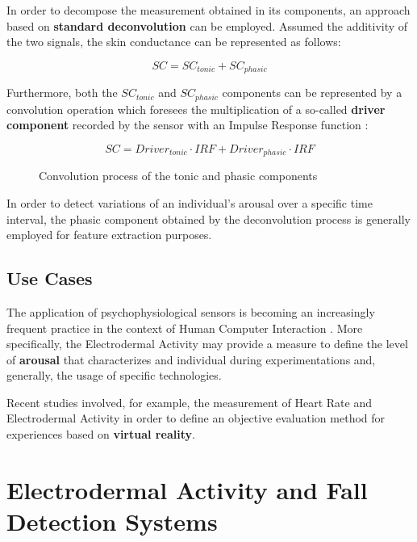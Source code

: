 In order to decompose the measurement obtained in its components, an approach based on \textbf{standard deconvolution} can be employed. Assumed the additivity of the two signals, the skin conductance can be represented as follows:

\begin{equation}
    SC = SC_{tonic} + SC_{phasic}
\end{equation}

Furthermore, both the $SC_{tonic}$ and $SC_{phasic}$ components can be represented by a convolution operation which foresees the multiplication of a so-called \textbf{driver component} recorded by the sensor with an Impulse Response function \cite{edasvm}:

\begin{figure}[h]
\begin{equation}
SC = Driver_{tonic} \cdot IRF + Driver_{phasic} \cdot IRF
\end{equation}
\caption{Convolution process of the tonic and phasic components}
\label{fig:eda-convolution}
\end{figure}

In order to detect variations of an individual's arousal over a specific time interval, the phasic component obtained by the deconvolution process is generally employed for feature extraction purposes.

\subsection{Use Cases}\label{subsec:eda-usecases}

The application of psychophysiological sensors is becoming an increasingly frequent practice in the context of Human Computer Interaction \cite{eda-hci}. More specifically, the Electrodermal Activity may provide a measure to define the level of \textbf{arousal} that characterizes and individual during experimentations and, generally, the usage of specific technologies.

Recent studies involved, for example, the measurement of Heart Rate and Electrodermal Activity in order to define an objective evaluation method for experiences based on \textbf{virtual reality}.

\section{Electrodermal Activity and Fall Detection Systems}\label{sec:eda-fall-detection}

